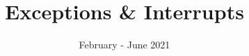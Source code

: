 \documentclass[]{slides}
\title{Exceptions \& Interrupts}
\date{February - June 2021}
\begin{document}
\printpdftrue %
\begin{frame} \titlepage \end{frame}

\end{document}
